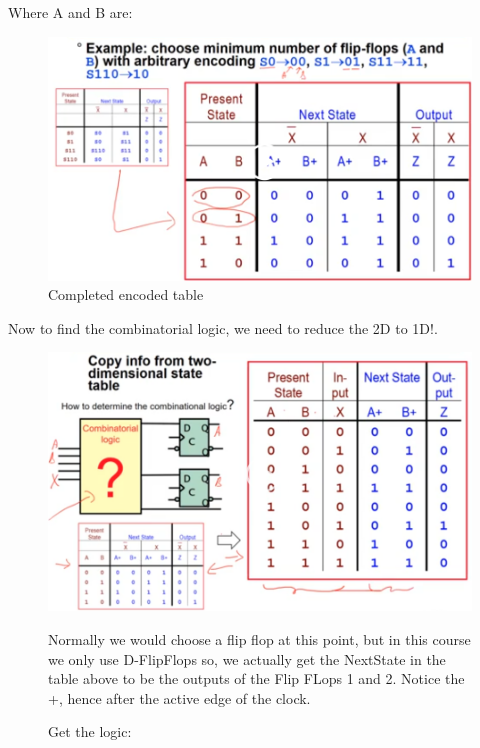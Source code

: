 \documentclass[11pt, a4paper]{article}
\begin{document}
\begin{enumerate}
    Where A and B are:
    \begin{figure}[H]
        \centering
        \includegraphics[width = \textwidth]{Pictures/FSM Ex1.4.png}
        \caption{Completed encoded table}
    \end{figure}
    \item Now to find the combinatorial logic, we need to reduce the 2D to 1D!.
    \begin{figure}[H]
        \centering
        \includegraphics[width = \textwidth]{Pictures/FSM Ex1.5.png}
        \caption{The ABX colum reprsents the combinatorial logic}
        \item Normally we would choose a flip flop at this point, but in this course we only use D-FlipFlops so, we actually get the NextState in the table above to be the outputs of the Flip FLops 1 and 2. Notice the +, hence after the active edge of the clock.
        \item Get the logic:
        \begin{figure}[H]
            \centering

\end{figure}
\end{figure}
\end{enumerate}
\end{document}
